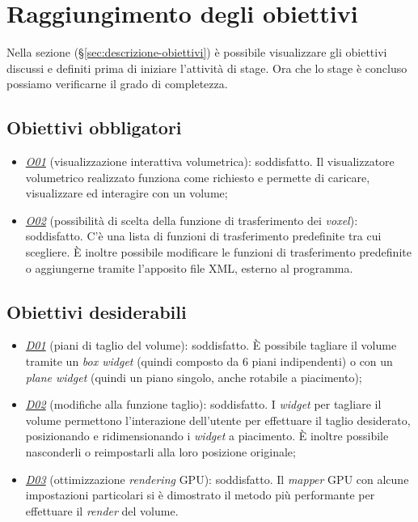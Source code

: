 \section{Raggiungimento degli obiettivi}
Nella sezione  (§\ref{sec:descrizione-obiettivi}) è possibile visualizzare gli obiettivi discussi e definiti prima di iniziare l'attività di stage. Ora che lo stage è concluso possiamo verificarne il grado di completezza.

\subsection{Obiettivi obbligatori}
\begin{itemize}
\item \underline{\textit{O01}} (visualizzazione interattiva volumetrica): soddisfatto. Il visualizzatore volumetrico realizzato funziona come richiesto e permette di caricare, visualizzare ed interagire con un volume;
\item \underline{\textit{O02}} (possibilità di scelta della funzione di trasferimento dei \emph{voxel}): soddisfatto. C'è una lista di funzioni di trasferimento predefinite tra cui scegliere. \`E inoltre possibile modificare le funzioni di trasferimento predefinite o aggiungerne tramite l'apposito file XML, esterno al programma.
\end{itemize}

\subsection{Obiettivi desiderabili}
\begin{itemize}
\item \underline{\textit{D01}} (piani di taglio del volume): soddisfatto. \`E possibile tagliare il volume tramite un \emph{box widget} (quindi composto da 6 piani indipendenti) o con un \emph{plane widget} (quindi un piano singolo, anche rotabile a piacimento);
\item \underline{\textit{D02}} (modifiche alla funzione taglio): soddisfatto. I \emph{widget} per tagliare il volume permettono l'interazione dell'utente per effettuare il taglio desiderato, posizionando e ridimensionando i \emph{widget} a piacimento. \`E inoltre possibile nasconderli o reimpostarli alla loro posizione originale;
\item \underline{\textit{D03}} (ottimizzazione \emph{rendering} GPU): soddisfatto. Il \emph{mapper} GPU con alcune impostazioni particolari si è dimostrato il metodo più performante per effettuare il \emph{render} del volume.
\end{itemize}

